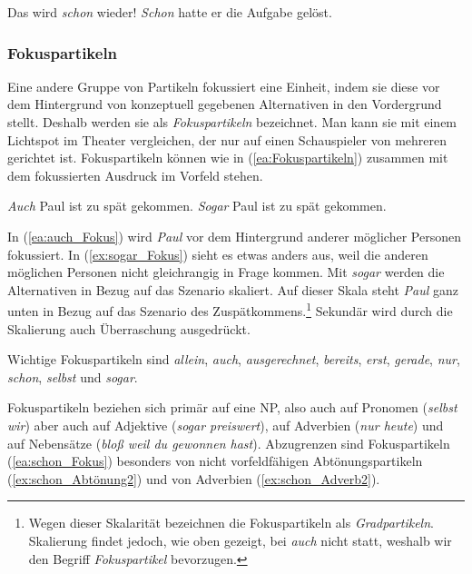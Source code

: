 \ea \label{ea:schon_Partikel_Konj}
\ea \label{ea:schon_Abtönung} Das wird \textit{schon} wieder!
\ex \label{ex:schon_Adverb} \textit{Schon} hatte er die Aufgabe gelöst.
\z 
\z 


\subsubsection{Fokuspartikeln}\label{subsubsection:Fokus}

Eine andere Gruppe von Partikeln fokussiert eine Einheit, indem sie diese vor dem Hintergrund von konzeptuell gegebenen Alternativen in den Vordergrund stellt. Deshalb werden sie als \textit{Fokuspartikeln} bezeichnet. Man kann sie mit einem Lichtspot im Theater vergleichen, der nur auf einen Schauspieler von mehreren gerichtet ist. Fokuspartikeln können wie in (\ref{ea:Fokuspartikeln}) zusammen mit dem fokussierten Ausdruck im Vorfeld stehen.

\ea \label{ea:Fokuspartikeln}
\ea \label{ea:auch_Fokus} \textit{Auch} Paul ist zu spät gekommen.
\ex \label{ex:sogar_Fokus} \textit{Sogar} Paul ist zu spät gekommen.
\z 
\z 

In (\ref{ea:auch_Fokus}) wird \textit{Paul} vor dem Hintergrund anderer möglicher Personen fokussiert. In (\ref{ex:sogar_Fokus}) sieht es etwas anders aus, weil die anderen möglichen Personen nicht gleichrangig in Frage kommen. Mit \textit{sogar} werden die Alternativen in Bezug auf das Szenario skaliert. Auf dieser Skala steht \textit{Paul} ganz unten in Bezug auf das Szenario des Zuspätkommens.\footnote{Wegen dieser Skalarität bezeichnen \citet[422]{HelbigBuscha} die Fokuspartikeln als \textit{Gradpartikeln}. Skalierung findet jedoch, wie oben gezeigt, \zB bei \textit{auch} nicht statt, weshalb wir den Begriff \textit{Fokuspartikel} bevorzugen.} Sekundär wird durch die Skalierung auch Überraschung ausgedrückt.

Wichtige Fokuspartikeln sind \textit{allein}, \textit{auch}, \textit{ausgerechnet}, \textit{bereits}, \textit{erst}, \textit{gerade}, \textit{nur}, \textit{schon}, \textit{selbst} und \textit{sogar}.

Fokuspartikeln beziehen sich primär auf eine NP, also auch auf Pronomen (\textit{selbst wir}) aber auch auf Adjektive (\textit{sogar preiswert}), auf Adverbien (\textit{nur heute}) und auf Nebensätze (\textit{bloß weil du gewonnen hast}). Abzugrenzen sind Fokuspartikeln (\ref{ea:schon_Fokus}) besonders von nicht vorfeldfähigen Abtönungspartikeln (\ref{ex:schon_Abtönung2}) und von Adverbien (\ref{ex:schon_Adverb2}).

